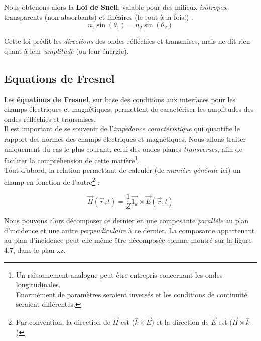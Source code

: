 Nous obtenons alors la \textbf{Loi de Snell}, valable pour des milieux \textit{isotropes}, transparents (non-absorbants) et linéaires (le tout à la fois!) :
\[ n_{1} \sin(\theta_{1}) = n_{2} \sin(\theta_{2})\]

Cette loi prédit les \textit{directions} des ondes réfléchies et transmises, mais ne dit rien quant à leur \textsl{amplitude} (ou leur énergie). 

\subsection{Equations de Fresnel}

Les \textbf{équations de Fresnel}, sur base des conditions aux interfaces pour les champs électriques et magnétiques, permettent de caractériser les amplitudes des ondes réfléchies et transmises. \\ 
Il est important de se souvenir de l'\textit{impédance caractéristique} qui quantifie le rapport des normes des champs électriques et magnétiques. Nous allons traiter uniquement du cas le plus courant, celui des ondes planes \textit{transverses}, afin de faciliter la compréhension de cette matière\footnote{Un raisonnement analogue peut-être entrepris concernant les ondes longitudinales. \\Enormément de paramètres seraient inversés et les conditions de continuité seraient différentes.}. \\

Tout d'abord, la relation permettant de calculer (de \textit{manière générale} ici) un champ en fonction de l'autre\footnote{Par convention, la direction de $\vec{H}$ est ($\hat{k} \times \vec{E}$) et la direction de $\vec{E}$ est 
($ \vec{H} \times \hat{k}$) } : 

\[\vec{H}(\vec{r},t) = \frac{1}{Z}\vec{1_k} \times \vec{E}(\vec{r},t) \]%

Nous pouvons alors décomposer ce dernier en une composante \textit{parallèle} au plan d'incidence et une autre \textit{perpendiculaire} à ce dernier. La composante appartenant au plan d'incidence peut elle même être décomposée comme montré sur la figure 4.7, dans le plan xz.\\ 

